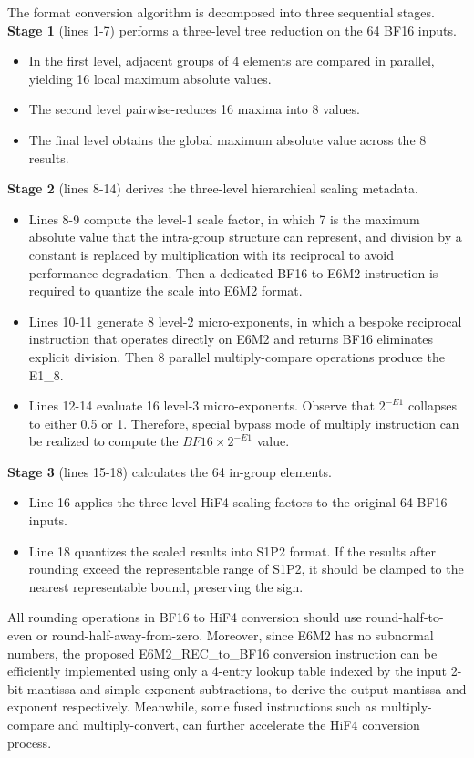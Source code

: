 The format conversion algorithm is decomposed into three 
sequential stages. \\
\textbf{Stage 1} (lines 1-7) performs a three-level tree reduction 
on the 64 BF16 inputs. 
\begin{itemize}
  \item In the first level, adjacent groups of 4 elements are 
  compared in parallel, yielding 16 local maximum absolute values. 
  \item The second level pairwise-reduces 16 maxima into 
  8 values. 
  \item The final level obtains the global maximum absolute value 
  across the 8 results.
\end{itemize}
\textbf{Stage 2} (lines 8-14) derives the three-level hierarchical 
scaling metadata.
\begin{itemize}
  \item Lines 8-9 compute the level-1 scale factor, 
  in which 7 is the maximum absolute value that the intra-group 
  structure can represent, 
  and division by a constant is replaced by multiplication with 
  its reciprocal to avoid performance degradation.  
  Then a dedicated BF16 to E6M2 instruction is required to quantize  
  the scale into E6M2 format. 
  \item Lines 10-11 generate 8 level-2 micro-exponents, 
  in which a bespoke reciprocal instruction that operates directly 
  on E6M2 and returns BF16 eliminates explicit division. 
  Then 8 parallel multiply-compare operations produce the E1\_8. 
  \item Lines 12-14 evaluate 16 level-3 micro-exponents. 
  Observe that $2^{-E1}$ collapses to either 0.5 or 1. 
  Therefore, special bypass mode of multiply instruction can be 
  realized to compute the $BF16\times2^{-E1}$ value. 
\end{itemize}
\textbf{Stage 3} (lines 15-18) calculates the 64 in-group elements.  
\begin{itemize}
  \item Line 16 applies the three-level HiF4 scaling factors to the 
  original 64 BF16 inputs.
  \item Line 18 quantizes the scaled results into S1P2 format. 
  If the results after rounding exceed the representable range 
  of S1P2, it should be clamped to the nearest representable bound, 
  preserving the sign. 
\end{itemize}

All rounding operations in BF16 to HiF4 conversion should use 
round-half-to-even or round-half-away-from-zero. 
Moreover, since E6M2 has no subnormal numbers, 
the proposed E6M2\_REC\_to\_BF16 conversion instruction can 
be efficiently implemented using only a 4-entry lookup table 
indexed by the input 2-bit mantissa and simple exponent 
subtractions, 
to derive the output mantissa and exponent respectively. 
Meanwhile, some fused instructions such as multiply-compare 
and multiply-convert, can further accelerate the HiF4 
conversion process. 




